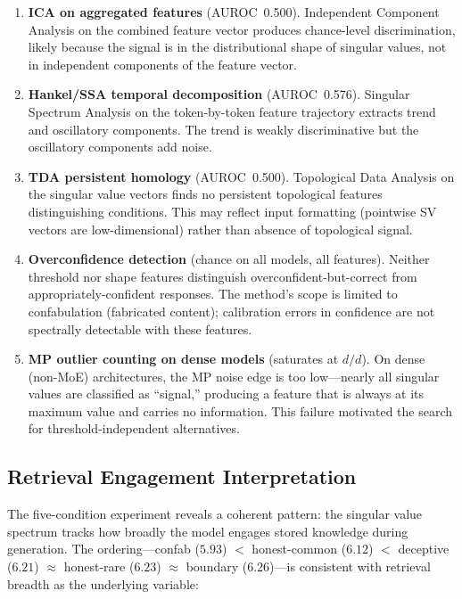 \documentclass[11pt,a4paper]{article}
\begin{document}
\begin{enumerate}
\item \textbf{ICA on aggregated features} (AUROC~0.500). Independent
  Component Analysis on the combined feature vector produces
  chance-level discrimination, likely because the signal is in the
  distributional shape of singular values, not in independent
  components of the feature vector.

\item \textbf{Hankel/SSA temporal decomposition} (AUROC~0.576).
  Singular Spectrum Analysis on the token-by-token feature trajectory
  extracts trend and oscillatory components. The trend is weakly
  discriminative but the oscillatory components add noise.

\item \textbf{TDA persistent homology} (AUROC~0.500). Topological
  Data Analysis on the singular value vectors finds no persistent
  topological features distinguishing conditions. This may reflect
  input formatting (pointwise SV vectors are low-dimensional) rather
  than absence of topological signal.

\item \textbf{Overconfidence detection} (chance on all models, all
  features). Neither threshold nor shape features distinguish
  overconfident-but-correct from appropriately-confident responses.
  The method's scope is limited to confabulation (fabricated content);
  calibration errors in confidence are not spectrally detectable with
  these features.

\item \textbf{MP outlier counting on dense models} (saturates at
  $d/d$). On dense (non-MoE) architectures, the MP noise edge is too
  low---nearly all singular values are classified as ``signal,''
  producing a feature that is always at its maximum value and carries
  no information. This failure motivated the search for
  threshold-independent alternatives.
\end{enumerate}

\subsection{Retrieval Engagement Interpretation}

The five-condition experiment reveals a coherent pattern: the singular
value spectrum tracks how broadly the model engages stored knowledge
during generation. The ordering---confab ($5.93$) $<$ honest-common
($6.12$) $<$ deceptive ($6.21$) $\approx$ honest-rare ($6.23$)
$\approx$ boundary ($6.26$)---is consistent with retrieval breadth as
the underlying variable:
\end{document}
